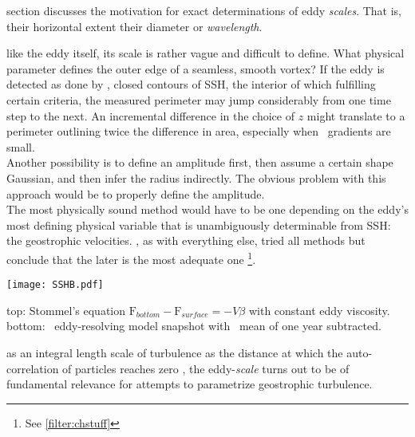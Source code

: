 section discusses the motivation for exact determinations of eddy \textit{scales}. That is, their horizontal extent \ie their diameter or \textit{wavelength}.

 like the eddy itself, its scale is rather vague and difficult to define. What physical parameter defines the outer edge of a seamless, smooth vortex? If the eddy is detected as done by \citet{Chelton2011}, \ie closed contours of SSH, the interior of which fulfilling certain criteria, the measured perimeter may jump considerably from one time step to the next. An incremental difference in the choice of $z$ might translate to a perimeter outlining twice the  difference in area, especially when \SSH~gradients are small.\\
Another possibility is to define an amplitude first, then assume a certain shape \eg Gaussian, and then infer the radius indirectly. The obvious problem with this approach would be to properly define the amplitude.\\
The most physically sound method would have to be one depending on the eddy's most defining physical variable that is unambiguously determinable from SSH: the geostrophic velocities. \citet{Chelton2011}, as with everything else, tried all methods but conclude that the later is the most adequate one \footnote{See \cref{filter:chstuff}}.

%
\begin{marginfigure}
\texttt{[image: SSHB.pdf]}
  \caption{top: Stommel's equation $\mathrm{F}_{bottom}-\mathrm{F}_{surface}= -V\beta$ with constant eddy viscosity. bottom: \POP~eddy-resolving model snapshot with \SSH~mean of one year subtracted. }
  \label{fig:SSHB}
\end{marginfigure}


 as an integral length scale of turbulence \ie as the distance at which the auto-correlation of particles reaches zero \citep{batchelor1969computation,Eden2007}, the eddy-\emph{scale} turns out to be of fundamental relevance for attempts to parametrize geostrophic turbulence.

